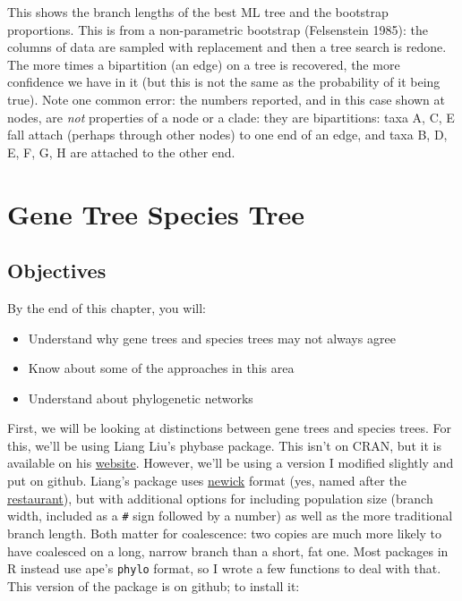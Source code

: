\documentclass[
]{article}
\providecommand{\tightlist}{%
  \setlength{\itemsep}{0pt}\setlength{\parskip}{0pt}}
\begin{document}
This shows the branch lengths of the best ML tree and the bootstrap proportions. This is from a non-parametric bootstrap (Felsenstein 1985): the columns of data are sampled with replacement and then a tree search is redone. The more times a bipartition (an edge) on a tree is recovered, the more confidence we have in it (but this is not the same as the probability of it being true). Note one common error: the numbers reported, and in this case shown at nodes, are \emph{not} properties of a node or a clade: they are bipartitions: taxa A, C, E fall attach (perhaps through other nodes) to one end of an edge, and taxa B, D, E, F, G, H are attached to the other end.

\hypertarget{gene-tree-species-tree}{%
\section{Gene Tree Species Tree}\label{gene-tree-species-tree}}

\hypertarget{objectives-7}{%
\subsection{Objectives}\label{objectives-7}}

By the end of this chapter, you will:

\begin{itemize}
\tightlist
\item
  Understand why gene trees and species trees may not always agree
\item
  Know about some of the approaches in this area
\item
  Understand about phylogenetic networks
\end{itemize}

First, we will be looking at distinctions between gene trees and species trees. For this, we'll be using Liang Liu's phybase package. This isn't on CRAN, but it is available on his \href{https://faculty.franklin.uga.edu/lliu/content/phybase?}{website}. However, we'll be using a version I modified slightly and put on github. Liang's package uses \href{http://evolution.genetics.washington.edu/phylip/newicktree.html}{newick} format (yes, named after the \href{http://newicks.com}{restaurant}), but with additional options for including population size (branch width, included as a \texttt{\#} sign followed by a number) as well as the more traditional branch length. Both matter for coalescence: two copies are much more likely to have coalesced on a long, narrow branch than a short, fat one. Most packages in R instead use ape's \texttt{phylo} format, so I wrote a few functions to deal with that. This version of the package is on github; to install it:
\end{document}
